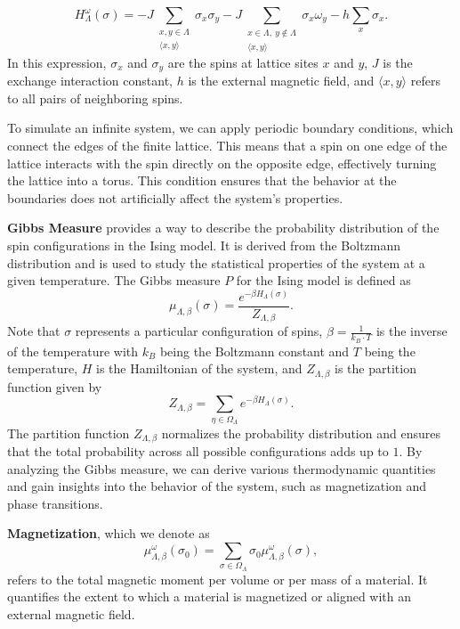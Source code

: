 \documentclass[11pt]{book}
\begin{document}
\begin{equation}\label{Hamiltonian}
H^{\omega}_{\Lambda}(\sigma) = -J \sum_{\substack{x,y\in \Lambda \\ \langle x,y \rangle}} \sigma_x \sigma_y -J \sum_{\substack{x\in \Lambda,\ y\notin \Lambda \\ \langle x,y \rangle}} \sigma_x \omega_y - h \sum_x \sigma_x.
\end{equation}
In this expression, $\sigma_x$ and $\sigma_y$ are the spins at lattice sites $x$ and $y$, $J$ is the exchange interaction constant, $h$ is the external magnetic field, and $\langle x,y \rangle$ refers to all pairs of neighboring spins.

To simulate an infinite system, we can apply periodic boundary conditions, which connect the edges of the finite lattice. This means that a spin on one edge of the lattice interacts with the spin directly on the opposite edge, effectively turning the lattice into a torus. This condition ensures that the behavior at the boundaries does not artificially affect the system’s properties.

\textbf{Gibbs Measure} provides a way to describe the probability distribution of the spin configurations in the Ising model. It is derived from the Boltzmann distribution and is used to study the statistical properties of the system at a given temperature. The Gibbs measure $P$ for the Ising model is defined as
\begin{equation}\label{gibbs_measure}
\mu_{\Lambda,\beta}(\sigma)= \frac{e^{-\beta H_\Lambda(\sigma)}}{Z_{\Lambda,\beta}}.
\end{equation}
Note that $\sigma$ represents a particular configuration of spins, $\beta = \frac{1}{k_B \cdot T}$ is the inverse of the temperature with $k_B$ being the Boltzmann constant and $T$ being the temperature, $H$ is the Hamiltonian of the system, and $Z_{\Lambda,\beta}$ is the partition function given by
\begin{equation}\label{Partition_Function}
Z_{\Lambda,\beta} = \sum_{\eta \in \Omega_\Lambda} e^{-\beta H_{\Lambda}(\sigma)}.
\end{equation}
The partition function $Z_{\Lambda,\beta}$ normalizes the probability distribution and ensures that the total probability across all possible configurations adds up to $1$. By analyzing the Gibbs measure, we can derive various thermodynamic quantities and gain insights into the behavior of the system, such as magnetization and phase transitions.

\textbf{Magnetization}, which we denote as 
\[
\mu^\omega _ {\Lambda,\beta} (\sigma_0) = \sum_{\sigma \in \Omega_{\Lambda}}\sigma_0 \mu^{\omega}_{\Lambda,\beta}(\sigma),
\]
refers to the total magnetic moment per volume or per mass of a material. It quantifies the extent to which a material is magnetized or aligned with an external magnetic field.  
\end{document}
